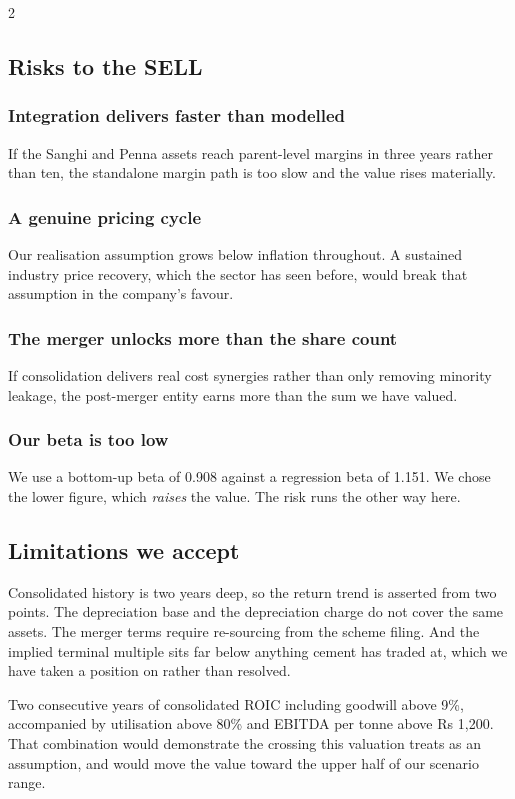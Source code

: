 \begin{paracol}{2}
\subsection{Risks to the SELL}

\subsubsection{Integration delivers faster than modelled} If the Sanghi and Penna
assets reach parent-level margins in three years rather than ten, the standalone
margin path is too slow and the value rises materially.

\subsubsection{A genuine pricing cycle} Our realisation assumption grows below
inflation throughout. A sustained industry price recovery, which the sector has seen
before, would break that assumption in the company's favour.

\subsubsection{The merger unlocks more than the share count} If consolidation
delivers real cost synergies rather than only removing minority leakage, the
post-merger entity earns more than the sum we have valued.

\subsubsection{Our beta is too low} We use a bottom-up beta of 0.908 against a
regression beta of 1.151. We chose the lower figure, which \emph{raises} the value.
The risk runs the other way here.

\subsection{Limitations we accept}

Consolidated history is two years deep, so the return trend is asserted from two
points. The depreciation base and the depreciation charge do not cover the same
assets. The merger terms require re-sourcing from the scheme filing. And the implied
terminal multiple sits far below anything cement has traded at, which we have taken a
position on rather than resolved.

\begin{keybox}
Two consecutive years of consolidated ROIC including goodwill above 9\%, accompanied
by utilisation above 80\% and EBITDA per tonne above Rs 1,200. That combination would
demonstrate the crossing this valuation treats as an assumption, and would move the
value toward the upper half of our scenario range.
\end{keybox}


\end{paracol}
